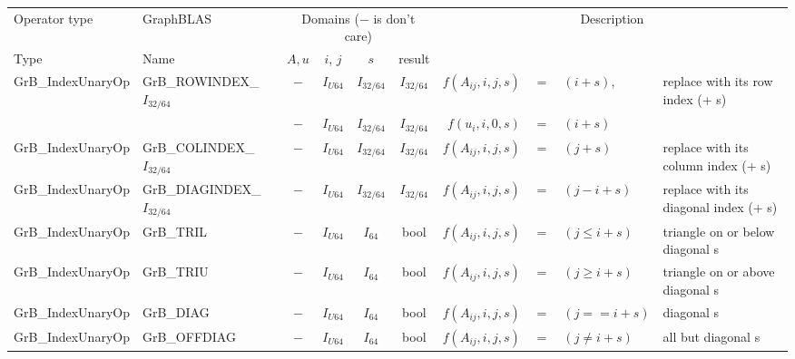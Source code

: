 \begin{landscape}
\begin{table}
\begin{threeparttable}
    {\small
\begin{tabular}{l|l|cccc|rcll}
Operator type             & GraphBLAS                		& \multicolumn{4}{c|}{Domains ($-$ is don't care)}	& \multicolumn{4}{c}{Description} \\ 
Type                      & Name                     		& $A,u$ & $i$, $j$  	& $s$ 		& result        & &&& \\ \hline
{\sf GrB\_IndexUnaryOp}   & {\sf GrB\_ROWINDEX\_$I_{32/64}$} 	& $-$   & $I_{U64}$	& $I_{32/64}$ 	& $I_{32/64}$ 	& $f(A_{ij},i,j,s)$ & $=$ & $(i + s)$, 		& replace with its row index (+ s) \\
                          &                          		& $-$   & $I_{U64}$ 	& $I_{32/64}$ 	& $I_{32/64}$ 	& $f(u_{i}, i,0,s)$ & $=$ & $(i + s)$  		& \\
{\sf GrB\_IndexUnaryOp}   & {\sf GrB\_COLINDEX\_$I_{32/64}$} 	& $-$   & $I_{U64}$ 	& $I_{32/64}$ 	& $I_{32/64}$ 	& $f(A_{ij},i,j,s)$ & $=$ & $(j + s)$ 		& replace with its column index (+ s) \\
{\sf GrB\_IndexUnaryOp}   & {\sf GrB\_DIAGINDEX\_$I_{32/64}$}	& $-$   & $I_{U64}$ 	& $I_{32/64}$ 	& $I_{32/64}$ 	& $f(A_{ij},i,j,s)$ & $=$ & $(j - i + s)$	& replace with its diagonal index (+ s) \\
\hline

{\sf GrB\_IndexUnaryOp}   & {\sf GrB\_TRIL}    			& $-$ 	& $I_{U64}$ 	& $I_{64}$ 	& {\sf bool} 	& $f(A_{ij},i,j,s)$ & $=$ & $(j \leq i + s)$ 	& triangle on or below diagonal s \\
{\sf GrB\_IndexUnaryOp}   & {\sf GrB\_TRIU}    			& $-$ 	& $I_{U64}$ 	& $I_{64}$ 	& {\sf bool} 	& $f(A_{ij},i,j,s)$ & $=$ & $(j \geq i + s)$ 	& triangle on or above diagonal s \\
{\sf GrB\_IndexUnaryOp}   & {\sf GrB\_DIAG}    			& $-$ 	& $I_{U64}$ 	& $I_{64}$ 	& {\sf bool} 	& $f(A_{ij},i,j,s)$ & $=$ & $(j  ==  i + s)$ 	& diagonal s \\
{\sf GrB\_IndexUnaryOp}   & {\sf GrB\_OFFDIAG} 			& $-$ 	& $I_{U64}$ 	& $I_{64}$ 	& {\sf bool} 	& $f(A_{ij},i,j,s)$ & $=$ & $(j \neq i + s)$ 	& all but diagonal s \\


\end{tabular}}
\end{threeparttable}
\end{table}
\end{landscape}
